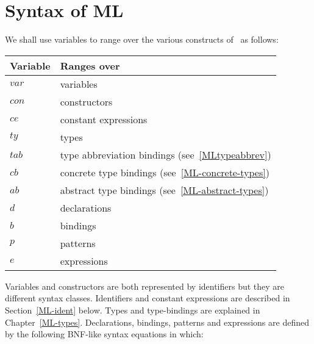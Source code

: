 \chapter{Syntax of ML}
\label{MLsyntax}

We shall use variables to range over the various constructs of \ML\ as
follows:

\begin{center}
\begin{tabular}{|l|l|}
\hline
Variable & Ranges over\\
\hline
$var$    & variables\\
$con$    & constructors\\
$ce$     & constant expressions\\
$ty$     & types\\
$tab$    & type abbreviation bindings (see~\ref{MLtypeabbrev})\\
$cb$     & concrete type bindings (see~\ref{ML-concrete-types})\\
$ab$     & abstract type bindings (see~\ref{ML-abstract-types})\\
$d$      & declarations\\
$b$      & bindings\\
$p$      & patterns\\
$e$      & expressions\\
\hline
\end{tabular}
\end{center}

Variables and  constructors are  both represented  by identifiers  but they are
different syntax classes.  Identifiers  and constant  expressions are described
in Section~\ref{ML-ident}  below.    Types  and type-bindings  are explained in
Chapter~\ref{ML-types}.  Declarations,  bindings, patterns  and expressions are
defined by the following BNF-like syntax equations in which:

